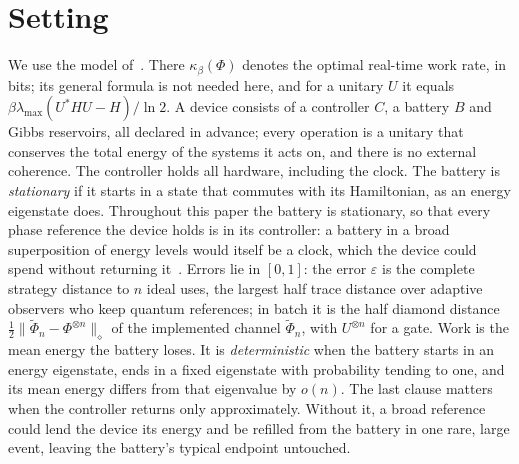 \documentclass[11pt]{article}
\theoremstyle{definition}
\theoremstyle{remark}
\newcommand{\Trt}{\kappa_\beta}
\begin{document}
\section{Setting}\label{sec:setting}

We use the model of~\cite[Sec.~2]{SaveWork}. There $\Trt(\Phi)$ denotes the optimal real-time work rate, in bits; its general formula is not needed here, and for a unitary $U$ it equals $\beta\lambda_{\max}(U^*HU-H)/\ln2$. A device consists of a controller $C$, a battery $B$ and Gibbs reservoirs, all declared in advance; every operation is a unitary that conserves the total energy of the systems it acts on, and there is no external coherence. The controller holds all hardware, including the clock. The battery is \emph{stationary} if it starts in a state that commutes with its Hamiltonian, as an energy eigenstate does. Throughout this paper the battery is stationary, so that every phase reference the device holds is in its controller: a battery in a broad superposition of energy levels would itself be a clock, which the device could spend without returning it~\cite{SaveWork}. Errors lie in $[0,1]$: the error $\varepsilon$ is the complete strategy distance to $n$ ideal uses, the largest half trace distance over adaptive observers who keep quantum references; in batch it is the half diamond distance $\tfrac12\|\widetilde\Phi_n-\Phi^{\otimes n}\|_\diamond$ of the implemented channel $\widetilde\Phi_n$, with $U^{\otimes n}$ for a gate. Work is the mean energy the battery loses. It is \emph{deterministic} when the battery starts in an energy eigenstate, ends in a fixed eigenstate with probability tending to one, and its mean energy differs from that eigenvalue by $o(n)$. The last clause matters when the controller returns only approximately. Without it, a broad reference could lend the device its energy and be refilled from the battery in one rare, large event, leaving the battery's typical endpoint untouched.
\end{document}
